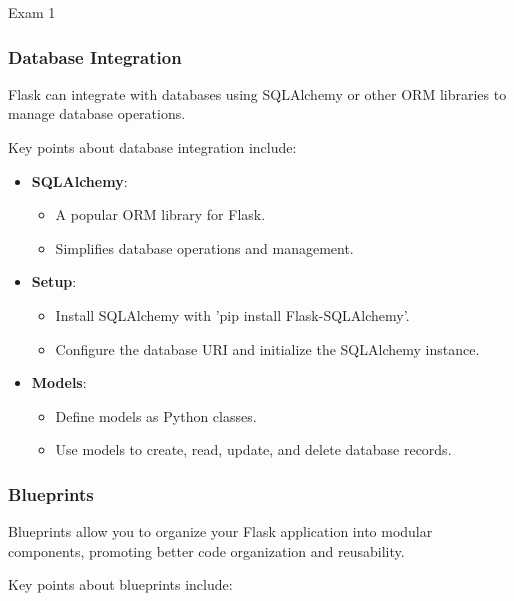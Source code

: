 \begin{examnotes}{Exam 1}
    \subsubsection*{Database Integration}
    
    Flask can integrate with databases using SQLAlchemy or other ORM libraries to manage database operations.
    
    \begin{highlight}
        Key points about database integration include:
        
        \begin{itemize}
            \item \textbf{SQLAlchemy}:
                \begin{itemize}
                    \item A popular ORM library for Flask.
                    \item Simplifies database operations and management.
                \end{itemize}
            \item \textbf{Setup}:
                \begin{itemize}
                    \item Install SQLAlchemy with 'pip install Flask-SQLAlchemy'.
                    \item Configure the database URI and initialize the SQLAlchemy instance.
                \end{itemize}
            \item \textbf{Models}:
                \begin{itemize}
                    \item Define models as Python classes.
                    \item Use models to create, read, update, and delete database records.
                \end{itemize}
        \end{itemize}
    \end{highlight}
    
    \subsubsection*{Blueprints}
    
    Blueprints allow you to organize your Flask application into modular components, promoting better code organization and reusability.
    
    \begin{highlight}[Blueprints]
        Key points about blueprints include:
        

\end{highlight}
\end{examnotes}
